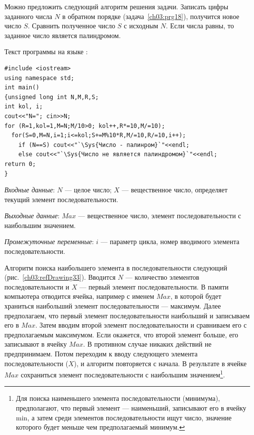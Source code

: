 Можно предложить следующий алгоритм решения задачи. Записать цифры заданного числа $N$ в обратном
порядке (задача~\ref{ch03:prg18}), получится новое число $S$.
Сравнить полученное число $S$ с исходным $N$. Если числа равны,
то заданное число является палиндромом.

Текст программы на языке :
\begin{lstlisting}
#include <iostream>
using namespace std;
int main()
{unsigned long int N,M,R,S; 
int kol, i;
cout<<"N="; cin>>N;
for (R=1,kol=1,M=N;M/10>0; kol++,R*=10,M/=10);
  for(S=0,M=N,i=1;i<=kol;S+=M%10*R,M/=10,R/=10,i++);
    if (N==S) cout<<"`\Sys{Число - палинром}`"<<endl;
    else cout<<"`\Sys{Число не является палиндромом}`"<<endl;
return 0;
}
\end{lstlisting}



\emph{Входные данные}: $N$ --- целое число; $X$ --- вещественное число,
определяет текущий элемент последовательности.

\emph{Выходные данные}: $Max$ --- вещественное число, элемент последовательности с
наибольшим значением.

\emph{Промежуточные переменные}: $i$ --- параметр цикла, номер вводимого элемента
последовательности.

Алгоритм поиска наибольшего элемента в последовательности следующий (рис.~\ref{ch03:refDrawing33}). 
Вводится $N$ --- количество элементов последовательности и $X$ --- первый элемент последовательности. 
В памяти компьютера отводится ячейка, например с
именем $Max$, в которой будет храниться наибольший элемент последовательности --- максимум. Далее
предполагаем, что первый элемент последовательности наибольший и записываем его в $Max$. Затем
вводим второй элемент последовательности и сравниваем его с предполагаемым максимумом. Если окажется, что второй
элемент больше, его записывают в ячейку $Max$. В противном случае никаких действий не предпринимаем.
Потом переходим к вводу следующего элемента последовательности ($X$), и алгоритм повторяется с начала. В результате в
ячейке $Max$ сохраниться элемент последовательности с наибольшим значением\footnote{Для поиска
наименьшего элемента последовательности (минимума), предполагают, что первый элемент --- наименьший, записывают его в
ячейку min, а затем среди элементов последовательности ищут число, значение которого будет меньше чем предполагаемый
минимум.}.


